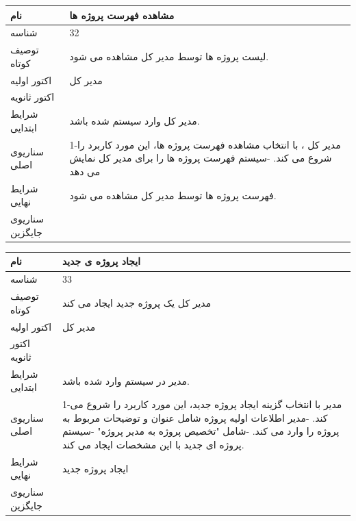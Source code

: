 \vspace{2cm}

\begin{tabular}{|p{2cm}|p{10cm}|}
\hline
نام
&
 مشاهده  فهرست پروژه ها
\\
\hline
شناسه
&
32
\\
\hline
توصیف کوتاه
&
لیست پروژه ها توسط مدیر کل مشاهده می شود.
\\
\hline
اکتور اولیه
&
مدیر کل
\\
\hline
اکتور ثانویه
&

\\
\hline
شرایط ابتدایی
&
مدیر کل وارد سیستم شده باشد. 
\\
\hline
سناریوی اصلی
&
1-مدیر کل ، با انتخاب مشاهده  فهرست پروژه ها، این مورد کاربرد را شروع می کند.
\newline
2-سیستم فهرست پروژه ها را برای مدیر کل نمایش می دهد
\\
\hline
شرایط نهایی
&
 فهرست پروژه ها توسط مدیر کل مشاهده می شود.
\\
\hline
سناریوی جایگزین
&

\\
\hline
\end{tabular}

\vspace{2cm}


\begin{tabular}{|p{2cm}|p{10cm}|}
\hline
نام
&
ایجاد پروژه ی جدید
\\
\hline
شناسه
&
33
\\
\hline
توصیف کوتاه
&
مدیر کل یک پروژه جدید ایجاد می کند
\\
\hline
اکتور اولیه
&
مدیر کل
\\
\hline
اکتور ثانویه
&

\\
\hline
شرایط ابتدایی
&
مدیر در سیستم وارد شده باشد.
\\
\hline
سناریوی اصلی
&
1-مدیر با انتخاب گزینه ایجاد پروژه جدید، این مورد کاربرد را شروع می کند.
\newline
2-مدیر اطلاعات اولیه پروژه شامل عنوان و توضیحات مربوط به پروژه را وارد می کند.
\newline
3-شامل "تخصیص پروژه به مدیر پروژه"
\newline
3-سیستم پروژه ای جدید با این مشخصات ایجاد می کند. 
\\
\hline
شرایط نهایی
&
ایجاد پروژه جدید
\\
\hline
سناریوی جایگزین
&

\\
\hline
\end{tabular}

